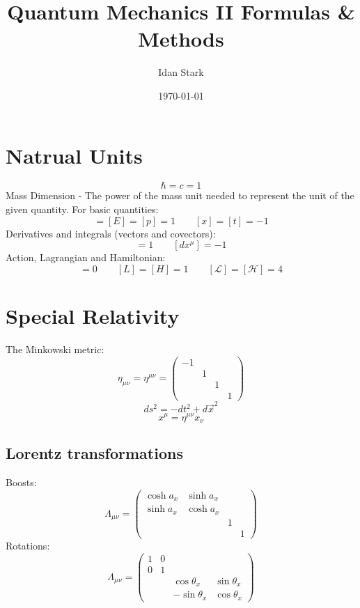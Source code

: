 \documentclass{article}
\title{Quantum Mechanics II Formulas \& Methods}
\author{Idan Stark}
\date{\today}
\begin{document}
\maketitle

\section{Natrual Units}
\begin{equation*}
    \hbar = c = 1
\end{equation*}
Mass Dimension - The power of the mass unit needed to represent the unit of the given quantity. For basic quantities:
\begin{equation*}
    [m] = [E] = [p] = 1
    \qquad
    [x] = [t] = -1
\end{equation*}
Derivatives and integrals (vectors and covectors):
\begin{equation*}
    [\partial_\mu] = 1
    \qquad
    [dx^\mu] = -1
\end{equation*}
Action, Lagrangian and Hamiltonian:
\begin{equation*}
    [S] = 0
    \qquad
    [L] = [H] = 1
    \qquad
    [\mathcal{L}] = [\mathcal{H}] = 4
\end{equation*}

\section{Special Relativity}
The Minkowski metric:
\begin{equation*}
    \eta_{\mu\nu} = \eta^{\mu\nu} = \begin{pmatrix} -1 & & & \\ & 1 & & \\ & & 1 & \\ & & & 1 \end{pmatrix}
\end{equation*}
\begin{equation*}
    ds^2 = -dt^2 + d\vec{x}^2
\end{equation*}
\begin{equation*}
    x^\mu = \eta^{\mu\nu}x_\nu
\end{equation*}
\subsection{Lorentz transformations}
Boosts:
\begin{equation*}
    \Lambda_{\mu\nu} = \begin{pmatrix} \cosh a_x & \sinh a_x & & \\ \sinh a_x & \cosh a_x & & \\ & & 1 & \\ & & & 1 \end{pmatrix}
\end{equation*}
Rotations:
\begin{equation*}
    \Lambda_{\mu\nu} = \begin{pmatrix} 1 & 0 & & \\ 0 & 1 & & \\ & & \cos \theta_x & \sin \theta_x \\ & & -\sin \theta_x & \cos \theta_x \end{pmatrix}
\end{equation*}
\end{document}
